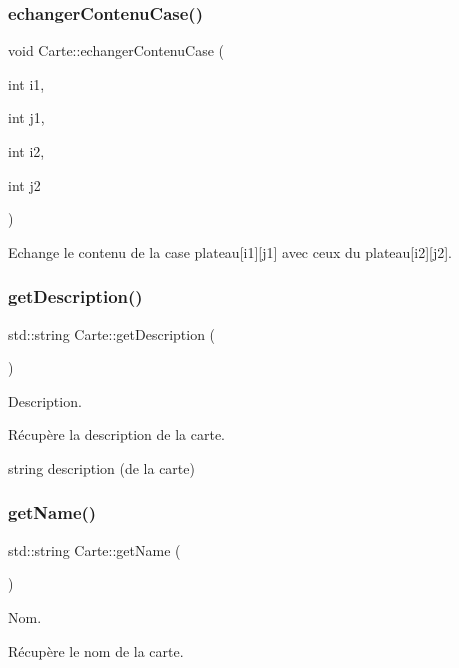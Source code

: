 \subsubsection{\texorpdfstring{echanger\+Contenu\+Case()}{echangerContenuCase()}}
{\footnotesize\ttfamily void Carte\+::echanger\+Contenu\+Case (\begin{DoxyParamCaption}\item[{int}]{i1,  }\item[{int}]{j1,  }\item[{int}]{i2,  }\item[{int}]{j2 }\end{DoxyParamCaption})}



Echange le contenu de la case plateau\mbox{[}i1\mbox{]}\mbox{[}j1\mbox{]} avec ceux du plateau\mbox{[}i2\mbox{]}\mbox{[}j2\mbox{]}. 

\mbox{\label{class_carte_a591705d6bb95c36ce4a034b3107ae85c}} 
\subsubsection{\texorpdfstring{get\+Description()}{getDescription()}}
{\footnotesize\ttfamily std\+::string Carte\+::get\+Description (\begin{DoxyParamCaption}{ }\end{DoxyParamCaption})}



Description. 

Récupère la description de la carte.

string description (de la carte) \mbox{\label{class_carte_a376e889c21215615bfa3b5068f46e646}} 
\subsubsection{\texorpdfstring{get\+Name()}{getName()}}
{\footnotesize\ttfamily std\+::string Carte\+::get\+Name (\begin{DoxyParamCaption}{ }\end{DoxyParamCaption})}



Nom. 

Récupère le nom de la carte.

